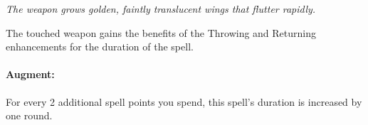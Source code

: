\emph{The weapon grows golden, faintly translucent wings that flutter rapidly.}

The touched weapon gains the benefits of the Throwing and Returning enhancements for the duration of the spell.

\paragraph{Augment:} For every 2 additional spell points you spend, this spell's duration is increased by one round.